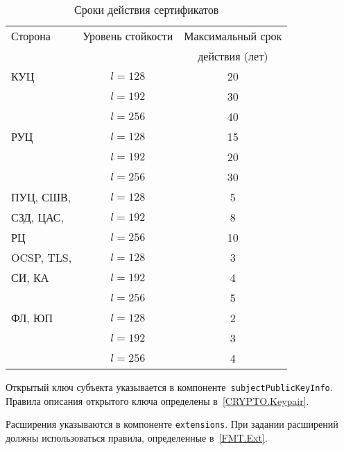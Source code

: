 \begin{table}
\caption{Сроки действия сертификатов}
\label{Table.CERT.Validity}
\begin{tabular}{|l|c|c|}
\hline
Сторона & Уровень стойкости & Максимальный срок\\
        &                   & действия (лет)\\
\hline
\hline

КУЦ & $l=128$ & 20\\
\cline{2-3} & $l=192$ & 30\\
\cline{2-3} & $l=256$ & 40\\
\hline

РУЦ & $l=128$ & 15\\
\cline{2-3} & $l=192$ & 20\\
\cline{2-3} & $l=256$ & 30\\
\hline

ПУЦ, СШВ,    & $l=128$ & 5\\
\cline{2-3}
СЗД, ЦАС,    & $l=192$ & 8\\
\cline{2-3} 
РЦ           & $l=256$ & 10\\
\hline

OCSP, TLS,  & $l=128$ & 3 \\
\cline{2-3}
СИ, КА & $l=192$ & 4\\
\cline{2-3} & $l=256$ & 5\\
\hline

ФЛ, ЮП & $l=128$ & 2 \\
\cline{2-3} & $l=192$ & 3 \\
\cline{2-3} & $l=256$ & 4 \\
\hline
\end{tabular}
\end{table}

Открытый ключ субъекта указывается в
компоненте~\texttt{subjectPublicKeyInfo}. Правила описания открытого ключа
определены в~\ref{CRYPTO.Keypair}.

Расширения указываются в компоненте \texttt{еxtensions}. При задании 
расширений должны использоваться правила, определенные в~\ref{FMT.Ext}. 
